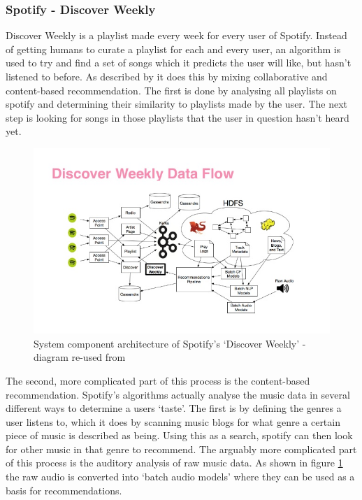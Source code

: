 \documentclass[a4paper,12pt]{report}
\begin{document}
      \subsubsection{Spotify - Discover Weekly}
      \label{discoverweekly}
        Discover Weekly is a playlist made every week for every user of Spotify. Instead of getting humans to curate a playlist for each and every user, an algorithm is used to try and find a set of songs which it predicts the user will like, but hasn't listened to before. As described by \cite{popper2015dw} it does this by mixing collaborative and content-based recommendation. The first is done by analysing all playlists on spotify and determining their similarity to playlists made by the user. The next step is looking for songs in those playlists that the user in question hasn't heard yet.

        \begin{figure}[H]
          \centering
          \includegraphics[width=\linewidth]{discoverweekly-dataflow}
          \caption[System component architecture of Spotify's ‘Discover Weekly’]{System component architecture of Spotify's ‘Discover Weekly’ - diagram re-used from  \protect\cite{johnson2015dw}}
          \label{fig:discoverweekly-dataflow}
        \end{figure}

        The second, more complicated part of this process is the content-based recommendation. Spotify's algorithms actually analyse the music data in several different ways to determine a users ‘taste’. The first is by defining the genres a user listens to, which it does by scanning music blogs for what genre a certain piece of music is described as being. Using this as a search, spotify can then look for other music in that genre to recommend. The arguably more complicated part of this process is the auditory analysis of raw music data. As shown in figure \ref{fig:discoverweekly-dataflow} the raw audio is converted into ‘batch audio models’ where they can be used as a basis for recommendations.
\end{document}
